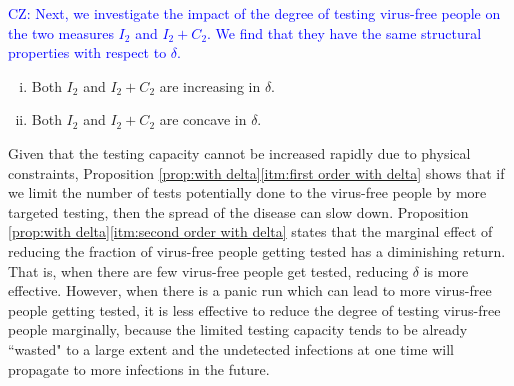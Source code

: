 \documentclass[nonblindrev, copyedit]{informs3a}
\newcommand\cz[1]{\textcolor{blue}{CZ: #1}}
\newcounter{prop}[chapter]
\begin{document}
\cz{Next, we investigate the impact of the degree of testing virus-free people on the two measures $I_2$ and $I_2+C_2$. We find that they have the same structural properties with respect to $\delta$.}

\begin{proposition}
\label{prop:with delta}
   \begin{enumerate}[(i)]
    \item\label{itm:first order with delta} Both $I_2$ and $I_2+C_2$ are increasing in $\delta$.
    \item\label{itm:second order with delta} Both $I_2$ and $I_2+C_2$ are concave in $\delta$.
   \end{enumerate}
\end{proposition}

Given that the testing capacity cannot be increased rapidly due to physical constraints, Proposition \ref{prop:with delta}\eqref{itm:first order with delta} shows that if we limit the number of tests potentially done to the virus-free people by more targeted testing, then the spread of the disease can slow down.
Proposition \ref{prop:with delta}\eqref{itm:second order with delta} states that the marginal effect of reducing the fraction of virus-free people getting tested has a diminishing return.
That is, when there are few virus-free people get tested, reducing $\delta$ is more effective. However, when there is a panic run which can lead to more virus-free people getting tested, it is less effective to reduce the degree of testing virus-free people marginally, because the limited testing capacity tends to be already ``wasted" to a large extent and the undetected infections at one time will propagate to more infections in the future.
\end{document}
